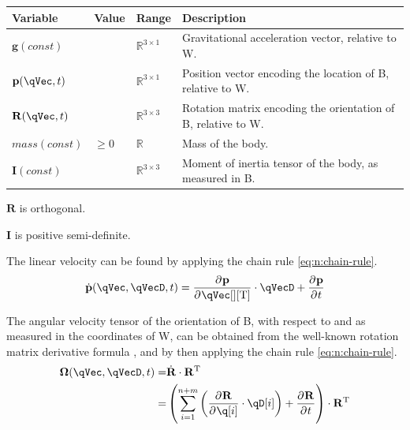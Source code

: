 \documentclass[11pt]{article}
\newcommand{\pD}[2]{
    \frac{\partial\mspace{1mu}#1}{\partial\mspace{1mu}#2}
}
\begin{document}
\begin{center}
\begin{threeparttable}
\begin{tabular}{llll}
    \textbf{Variable} & \textbf{Value} & \textbf{Range} & \textbf{Description}\\
    \hline
    $\mathbf{g}(const)$
        &
        & $\mathbb{R}^{3\times1}$
        & Gravitational acceleration vector, relative to W. \\
    $\mathbf{p}(\qVec, t)$
        &
        & $\mathbb{R}^{3\times1}$
        & Position vector encoding the location of B, relative to W. \\
    $\mathbf{R}(\qVec, t)$
        &
        & $\mathbb{R}^{3\times3}$
        & Rotation matrix encoding the orientation of B, relative to W. \\
    $mass(const)$
        & $\geq 0$
        & $\mathbb{R}$
        & Mass of the body. \\
    $\mathbf{I}(const)$
        &
        & $\mathbb{R}^{3\times3}$
        & Moment of inertia tensor of the body, as measured in B. \\
\end{tabular}
\begin{tablenotes}
    \item[1] $\mathbf{R}$ is orthogonal.
    \item[2] $\mathbf{I}$ is positive semi-definite.
\end{tablenotes}
\end{threeparttable}
\end{center}

The linear velocity can be found by applying the chain rule \eqref{eq:n:chain-rule}.
\begin{equation}
    \dot{\mathbf{p}}(\qVec, \qVecD, t) = \pD{\mathbf{p}}{\qVec[][\mathrm{T}]}\cdot\qVecD + \pD{\mathbf{p}}{t}
\end{equation}

The angular velocity tensor of the orientation of B, with respect to and as measured in the coordinates of W, can be obtained from the well-known rotation matrix derivative formula \cite{BJ3-43}, and by then applying the chain rule \eqref{eq:n:chain-rule}.
\begin{align}
    \bm{\Omega}(\qVec, \qVecD, t) =& \dot{\mathbf{R}} \cdot \mathbf{R}^{\mathrm{T}} \nonumber\\
    =& \del{\sum_{i=1}^{n+m}\del{\pD{\mathbf{R}}{\q[i]}\cdot\qD[i]} + \pD{\mathbf{R}}{t}} \cdot \mathbf{R}^{\mathrm{T}}
\end{align}
\end{document}
